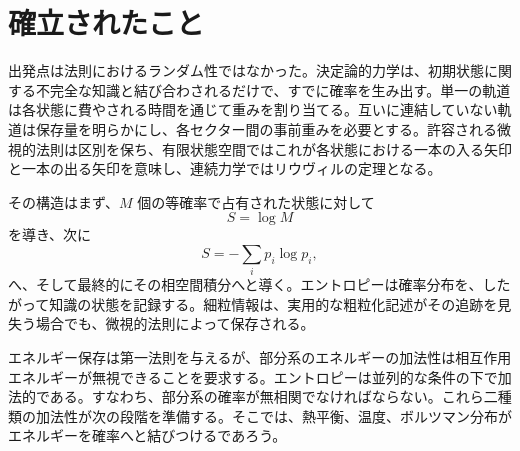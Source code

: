 \section{確立されたこと}

出発点は法則におけるランダム性ではなかった。決定論的力学は、初期状態に関する不完全な知識と結び合わされるだけで、すでに確率を生み出す。単一の軌道は各状態に費やされる時間を通じて重みを割り当てる。互いに連結していない軌道は保存量を明らかにし、各セクター間の事前重みを必要とする。許容される微視的法則は区別を保ち、有限状態空間ではこれが各状態における一本の入る矢印と一本の出る矢印を意味し、連続力学ではリウヴィルの定理となる。

その構造はまず、\(M\) 個の等確率で占有された状態に対して
\begin{equation}
 S=\log M
\end{equation}
を導き、次に
\begin{equation}
 S=-\sum_i p_i\log p_i,
\end{equation}
へ、そして最終的にその相空間積分へと導く。エントロピーは確率分布を、したがって知識の状態を記録する。細粒情報は、実用的な粗粒化記述がその追跡を見失う場合でも、微視的法則によって保存される。

エネルギー保存は第一法則を与えるが、部分系のエネルギーの加法性は相互作用エネルギーが無視できることを要求する。エントロピーは並列的な条件の下で加法的である。すなわち、部分系の確率が無相関でなければならない。これら二種類の加法性が次の段階を準備する。そこでは、熱平衡、温度、ボルツマン分布がエネルギーを確率へと結びつけるであろう。